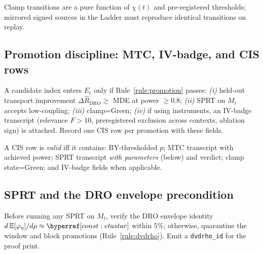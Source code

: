 \begin{remark}\label{rem:clamp-determinism}
Clamp transitions are a pure function of $\chi(t)$ and pre-registered thresholds; mirrored signed sources in the Ladder must reproduce identical transitions on replay.
\end{remark}

\subsection{Promotion discipline: MTC, IV-badge, and CIS rows}\label{subsec:mtc-iv}
\emph{}

\begin{definition}\label{def:mtc-iv}
A candidate index enters $E_t$ only if Rule~\ref{rule:promotion} passes: \emph{(i)} held-out transport improvement $\Delta \widehat R_{\mathrm{DRO}}\ge$ MDE at power $\ge0.8$; \emph{(ii)} SPRT on $M_t$ accepts low-coupling; \emph{(iii)} clamp=Green; \emph{(iv)} if using instruments, an IV-badge transcript (relevance $F>10$, preregistered exclusion across contexts, ablation sign) is attached. Record one CIS row per promotion with these fields.
\end{definition}

\begin{proposition}\label{prop:cis}
A CIS row is \emph{valid} iff it contains: BY-thresholded $p$; MTC transcript with achieved power; SPRT transcript \emph{with parameters} (below) and verdict; clamp state=Green; and IV-badge fields when applicable.
\end{proposition}

\subsection{SPRT and the DRO envelope precondition}\label{subsec:sprt-dvdrho}
\emph{}

\begin{definition}\label{def:env-pre}
Before running any SPRT on $M_t$, verify the DRO envelope identity $d\,\mathbb E[\varphi_\eta]/d\rho\approx \constref{etastar}$ within $5\%$; otherwise, quarantine the window and block promotions (Rule~\ref{rule:dvdrho}). Emit a \texttt{dvdrho\_id} for the proof print.
\end{definition}

